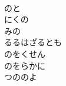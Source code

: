 \documentclass[10pt,b5j]{tarticle} %
\begin{document}
\begin{enumerate}
\begin{minipage}[c]{\blocksize}
        \vspace{\linespace}
        \item~\\
        のと\\
        にくの\\
        みの\\
        るるはざるとも\\
        のをくせん\\
        のをらかに\\
        つののよ
    
    \end{minipage}
\end{enumerate} %
\end{document}
